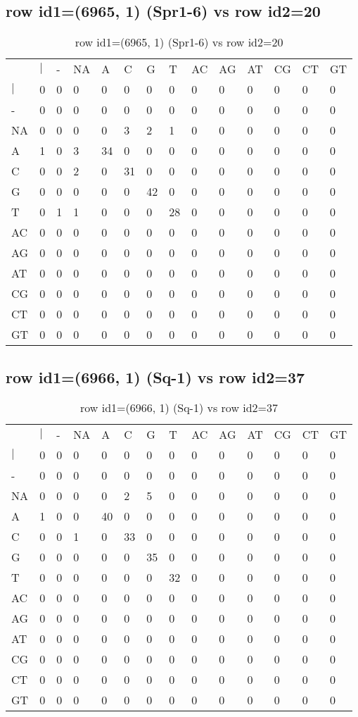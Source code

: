 \subsection{row id1=(6965, 1) (Spr1-6) vs row id2=20}
\begin{center}
\begin{longtable}{|l|l|l|l|l|l|l|l|l|l|l|l|l|l|}
\caption{row id1=(6965, 1) (Spr1-6) vs row id2=20} \label{table_dm172}\\
\hline
\\
\hline
&$|$&-&NA&A&C&G&T&AC&AG&AT&CG&CT&GT\\
$|$&0&0&0&0&0&0&0&0&0&0&0&0&0\\
-&0&0&0&0&0&0&0&0&0&0&0&0&0\\
NA&0&0&0&0&3&2&1&0&0&0&0&0&0\\
A&1&0&3&34&0&0&0&0&0&0&0&0&0\\
C&0&0&2&0&31&0&0&0&0&0&0&0&0\\
G&0&0&0&0&0&42&0&0&0&0&0&0&0\\
T&0&1&1&0&0&0&28&0&0&0&0&0&0\\
AC&0&0&0&0&0&0&0&0&0&0&0&0&0\\
AG&0&0&0&0&0&0&0&0&0&0&0&0&0\\
AT&0&0&0&0&0&0&0&0&0&0&0&0&0\\
CG&0&0&0&0&0&0&0&0&0&0&0&0&0\\
CT&0&0&0&0&0&0&0&0&0&0&0&0&0\\
GT&0&0&0&0&0&0&0&0&0&0&0&0&0\\
\hline
\end{longtable}
\end{center}

\subsection{row id1=(6966, 1) (Sq-1) vs row id2=37}
\begin{center}
\begin{longtable}{|l|l|l|l|l|l|l|l|l|l|l|l|l|l|}
\caption{row id1=(6966, 1) (Sq-1) vs row id2=37} \label{table_dm174}\\
\hline
\\
\hline
&$|$&-&NA&A&C&G&T&AC&AG&AT&CG&CT&GT\\
$|$&0&0&0&0&0&0&0&0&0&0&0&0&0\\
-&0&0&0&0&0&0&0&0&0&0&0&0&0\\
NA&0&0&0&0&2&5&0&0&0&0&0&0&0\\
A&1&0&0&40&0&0&0&0&0&0&0&0&0\\
C&0&0&1&0&33&0&0&0&0&0&0&0&0\\
G&0&0&0&0&0&35&0&0&0&0&0&0&0\\
T&0&0&0&0&0&0&32&0&0&0&0&0&0\\
AC&0&0&0&0&0&0&0&0&0&0&0&0&0\\
AG&0&0&0&0&0&0&0&0&0&0&0&0&0\\
AT&0&0&0&0&0&0&0&0&0&0&0&0&0\\
CG&0&0&0&0&0&0&0&0&0&0&0&0&0\\
CT&0&0&0&0&0&0&0&0&0&0&0&0&0\\
GT&0&0&0&0&0&0&0&0&0&0&0&0&0\\
\hline
\end{longtable}
\end{center}

